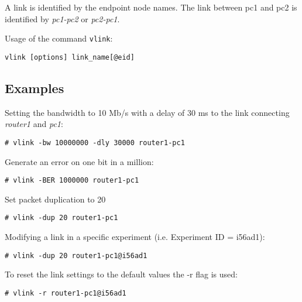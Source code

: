 A link is identified by the endpoint node names. The link between pc1 and pc2 is identified by \emph{pc1-pc2} or \emph{pc2-pc1}.

Usage of the command \texttt{vlink}:

\texttt{vlink [options] link\_name[@eid]} \hfill

\subsection{Examples}

Setting the bandwidth to 10 Mb/s with a delay of 30 ms to the link connecting \emph{router1} and \emph{pc1}:

\texttt{\# vlink -bw 10000000 -dly 30000 router1-pc1}

Generate an error on one bit in a million:

\texttt{\# vlink -BER 1000000 router1-pc1}

Set packet duplication to 20%

\texttt{\# vlink -dup 20 router1-pc1}

Modifying a link in a specific experiment (i.e. Experiment ID = i56ad1):

\texttt{\# vlink -dup 20 router1-pc1@i56ad1}

To reset the link settings to the default values the -r flag is used:

\texttt{\# vlink -r router1-pc1@i56ad1}
